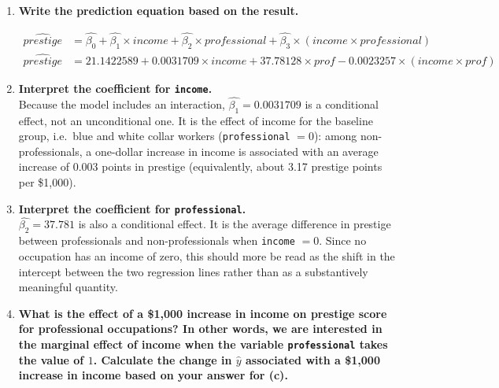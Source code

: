 \documentclass[12pt,letterpaper]{article}
\begin{document}
\begin{enumerate}
\begin{verbatim}
			Residual standard error: 8.012 on 94 degrees of freedom
			(4 observations deleted due to missingness)
			Multiple R-squared:  0.7872,	Adjusted R-squared:  0.7804 
			F-statistic: 115.9 on 3 and 94 DF,  p-value: < 2.2e-16
		\end{verbatim}
		
		
	\item [(c)]
	\textbf{Write the prediction equation based on the result.} 
	
	\begin{align*}
	\widehat{prestige} &= \hat{\beta_0} + \hat{\beta_1} \times income + \hat{\beta_2} \times professional + \hat{\beta_3} \times (income \times professional)\\
	\widehat{prestige} &= 21.1422589 + 0.0031709 \times income + 37.78128 \times prof -0.0023257 \times (income \times prof)
	\end{align*}
	\vspace{.1cm}	
	
	\item [(d)]
	\textbf{Interpret the coefficient for \texttt{income}.} \\
		
		\noindent Because the model includes an interaction, $\hat{\beta_1}=0.0031709$ is a conditional effect, not an unconditional one. It is the effect of income for the baseline group, i.e.\ blue and white collar workers (\texttt{professional} $=0$): among non-professionals, a one-dollar increase in income is associated with an average increase of 0.003 points in prestige (equivalently, about 3.17 prestige points per \$1,000).
		
	\vspace{.5cm}	
	
	\item [(e)]
	\textbf{Interpret the coefficient for \texttt{professional}.} \\
		
		\noindent $\hat{\beta_2}=37.781$ is also a conditional effect. It is the average difference in prestige between professionals and non-professionals when \texttt{income} $=0$. Since no occupation has an income of zero, this should more be read as the shift in the intercept between the two regression lines rather than as a substantively meaningful quantity.
		
	\vspace{1cm}	
	
	\item [(f)]
	\textbf{What is the effect of a \$1,000 increase in income on prestige score for professional occupations? In other words, we are interested in the marginal effect of income when the variable \texttt{professional} takes the value of $1$. Calculate the change in $\hat{y}$ associated with a \$1,000 increase in income based on your answer for (c).}
	\vspace{.5cm}
		

\end{enumerate}
\end{document}
